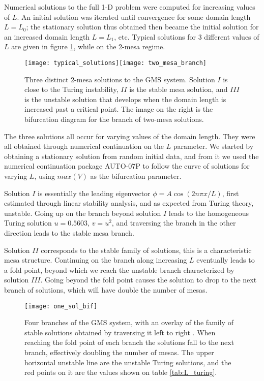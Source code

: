 
Numerical solutions to the full 1-D problem were computed for increasing values of $L$. An initial solution was iterated until convergence for some domain length $L=L_0$; the stationary solution thus obtained then became the initial solution for an increased domain length $L=L_1$, etc. Typical solutions for 3 different values of $L$ are given in figure \ref{fig:typical}, while on the 2-mesa regime. 
% 
\begin{figure}[htb]
\begin{center}
\texttt{[image: typical\_solutions]}\texttt{[image: two\_mesa\_branch]}

\caption{Three distinct 2-mesa solutions to the GMS system. Solution $I$ is close to the Turing instability, $II$ is the stable mesa solution, and $III$ is the unstable solution that develops when the domain length is increased past a critical point. The image on the right is the bifurcation diagram for the branch of two-mesa solutions.}
\label{fig:typical}
\end{center}
\end{figure}
% 
The three solutions all occur for varying values of the domain length. They were all obtained through numerical continuation on the $L$ parameter. We started by obtaining a stationary solution from random initial data, and from it we used the numerical continuation package AUTO-07P \cite{doedel_auto-07p} to follow the curve of solutions for varying $L$, using $max(V)$ as the bifurcation parameter. 

Solution $I$ is essentially the leading eigenvector $\phi = A\cos(2n\pi x/L)$, first estimated through linear stability analysis, and as expected from Turing theory, unstable. Going up on the branch beyond solution $I$ leads to the homogeneous Turing solution $u=0.5603$, $v=u^2$, and traversing the branch in the other direction leads to the stable mesa branch.

Solution $II$ corresponds to the stable family of solutions, this is a characteristic mesa structure. Continuing on the branch along increasing $L$ eventually leads to a fold point, beyond which we reach the unstable branch characterized by solution $III$. Going beyond the fold point causes the solution to drop to the next branch of solutions, which will have double the number of mesas.
% 
\begin{figure}[htb]
\begin{center}
\texttt{[image: one\_sol\_bif]}
\caption{Four branches of the GMS system, with an overlay of the family of stable solutions obtained by traversing it left to right . When reaching the fold point of each branch the solutions fall to the next branch, effectively doubling the number of mesas. The upper horizontal unstable line are the unstable Turing solutions, and the red points on it are the values shown on table \ref{tab:L_turing}.}
\label{fig:one_sol}
\end{center}
\end{figure}
% 


